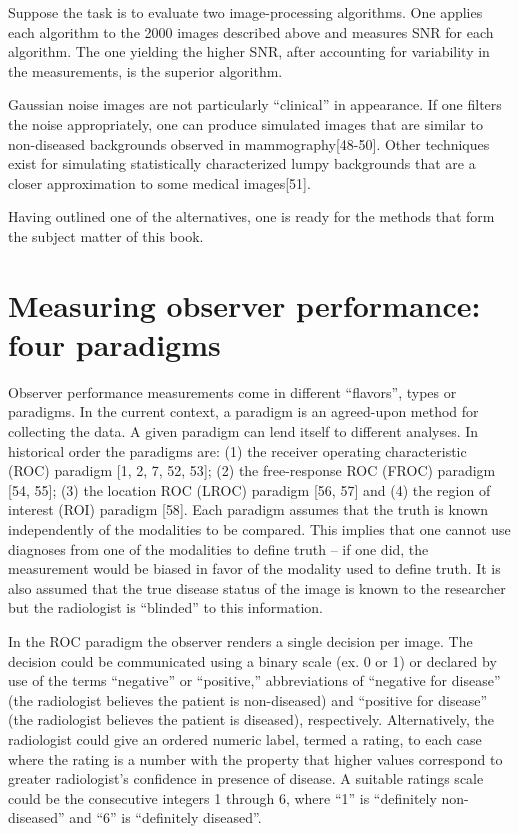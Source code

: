 \documentclass[
]{book}
\begin{document}
Suppose the task is to evaluate two image-processing algorithms. One applies each algorithm to the 2000 images described above and measures SNR for each algorithm. The one yielding the higher SNR, after accounting for variability in the measurements, is the superior algorithm.

Gaussian noise images are not particularly ``clinical'' in appearance. If one filters the noise appropriately, one can produce simulated images that are similar to non-diseased backgrounds observed in mammography{[}48-50{]}. Other techniques exist for simulating statistically characterized lumpy backgrounds that are a closer approximation to some medical images{[}51{]}.

Having outlined one of the alternatives, one is ready for the methods that form the subject matter of this book.

\hypertarget{measuring-observer-performance-four-paradigms}{%
\section{Measuring observer performance: four paradigms}\label{measuring-observer-performance-four-paradigms}}

Observer performance measurements come in different ``flavors'', types or paradigms. In the current context, a paradigm is an agreed-upon method for collecting the data. A given paradigm can lend itself to different analyses. In historical order the paradigms are: (1) the receiver operating characteristic (ROC) paradigm {[}1, 2, 7, 52, 53{]}; (2) the free-response ROC (FROC) paradigm {[}54, 55{]}; (3) the location ROC (LROC) paradigm {[}56, 57{]} and (4) the region of interest (ROI) paradigm {[}58{]}. Each paradigm assumes that the truth is known independently of the modalities to be compared. This implies that one cannot use diagnoses from one of the modalities to define truth -- if one did, the measurement would be biased in favor of the modality used to define truth. It is also assumed that the true disease status of the image is known to the researcher but the radiologist is ``blinded'' to this information.

In the ROC paradigm the observer renders a single decision per image. The decision could be communicated using a binary scale (ex. 0 or 1) or declared by use of the terms ``negative'' or ``positive,'' abbreviations of ``negative for disease'' (the radiologist believes the patient is non-diseased) and ``positive for disease'' (the radiologist believes the patient is diseased), respectively. Alternatively, the radiologist could give an ordered numeric label, termed a rating, to each case where the rating is a number with the property that higher values correspond to greater radiologist's confidence in presence of disease. A suitable ratings scale could be the consecutive integers 1 through 6, where ``1'' is ``definitely non-diseased'' and ``6'' is ``definitely diseased''.
\end{document}
